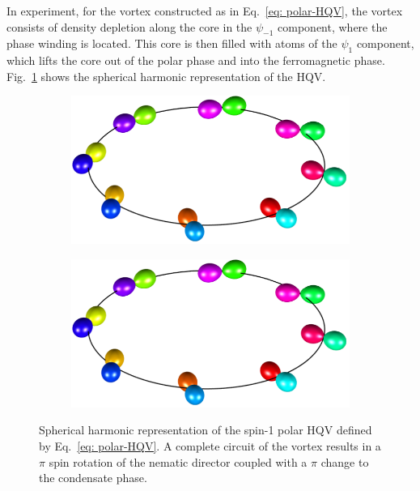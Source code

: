 In experiment, for the vortex constructed as in Eq.~\eqref{eq: polar-HQV}, the
vortex consists of density depletion along the core in the \(\psi_{-1}\)
component, where the phase winding is located.
This core is then filled with atoms of the \(\psi_1 \) component, which lifts
the core out of the polar phase and into the ferromagnetic phase.
Fig.~\ref{subfig: polar-HQV} shows the spherical harmonic representation of the
HQV.\@
\begin{figure}
    \centering
    \begin{subfigure}{0.49\textwidth}
        \includegraphics[width=\textwidth]
        {gfx/ch-groundStateSymmetries/polar-HQV.pdf}
        \caption{\label{subfig: polar-HQV}}
    \end{subfigure}
    \begin{subfigure}{0.49\textwidth}
        \includegraphics[width=\textwidth]
        {gfx/ch-groundStateSymmetries/polar-HQV.pdf}
        \caption{\label{subfig: coreless-vortex}}
    \end{subfigure}
    \caption{Spherical harmonic representation of the spin-1 polar HQV defined by
    Eq.~\eqref{eq: polar-HQV}.
    A complete circuit of the vortex results in a \(\pi \) spin rotation of
    the nematic director coupled with a \(\pi \) change to the condensate phase.
    }
\end{figure}

